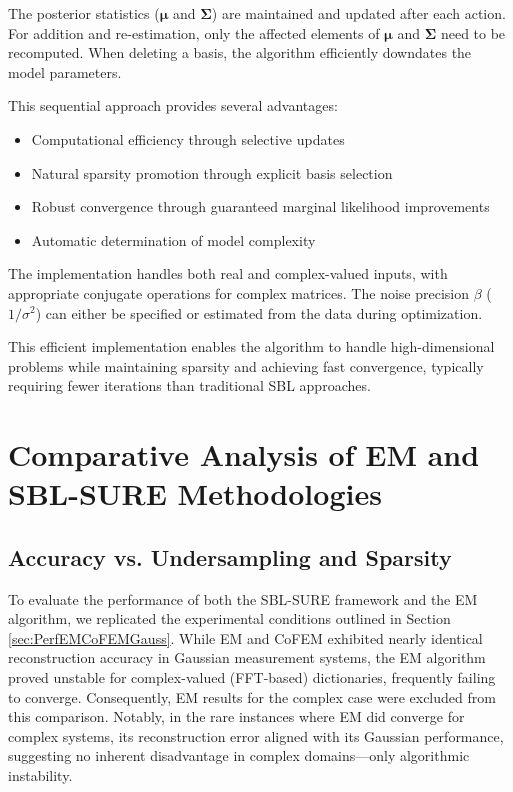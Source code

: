 \documentclass{article}
\begin{document}
The posterior statistics ($\boldsymbol{\mu}$ and $\boldsymbol{\Sigma}$) are maintained and updated after each action. For addition and re-estimation, only the affected elements of $\boldsymbol{\mu}$ and $\boldsymbol{\Sigma}$ need to be recomputed. When deleting a basis, the algorithm efficiently downdates the model parameters.

This sequential approach provides several advantages:
\begin{itemize}
\item Computational efficiency through selective updates
\item Natural sparsity promotion through explicit basis selection
\item Robust convergence through guaranteed marginal likelihood improvements
\item Automatic determination of model complexity
\end{itemize}

The implementation handles both real and complex-valued inputs, with appropriate conjugate operations for complex matrices. The noise precision $\beta$ ($1/\sigma^2$) can either be specified or estimated from the data during optimization.

This efficient implementation enables the algorithm to handle high-dimensional problems while maintaining sparsity and achieving fast convergence, typically requiring fewer iterations than traditional SBL approaches.

\section{Comparative Analysis of EM and SBL-SURE Methodologies}
\subsection{Accuracy vs. Undersampling and Sparsity}
To evaluate the performance of both the SBL-SURE framework and the EM algorithm, we replicated the experimental conditions outlined in Section \ref{sec:PerfEMCoFEMGauss}. While EM and CoFEM exhibited nearly identical reconstruction accuracy in Gaussian measurement systems, the EM algorithm proved unstable for complex-valued (FFT-based) dictionaries, frequently failing to converge. Consequently, EM results for the complex case were excluded from this comparison. Notably, in the rare instances where EM did converge for complex systems, its reconstruction error aligned with its Gaussian performance, suggesting no inherent disadvantage in complex domains—only algorithmic instability.
\end{document}
